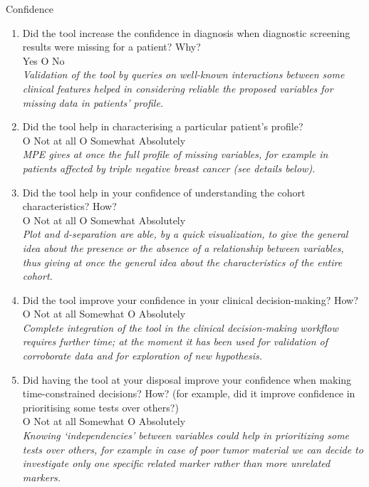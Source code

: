 \begin{mdframed}
	{\Large Confidence}
	\begin{enumerate} 
		\item Did the tool increase the confidence in diagnosis when diagnostic screening results were missing for a patient?  Why? \\
		 Yes O No \\
		\textit{Validation of the tool by queries on well-known interactions between some clinical features helped in considering reliable the proposed variables for missing data in patients' profile.}
		\item Did the tool help in characterising a particular patient's profile? \\
		O Not at all O Somewhat  Absolutely\\
		\textit{MPE gives at once the full profile of missing variables, for example in patients affected by triple negative breast cancer (see details below).}
		\item Did the tool help in your confidence of understanding the cohort characteristics?  How? \\
		O Not at all O Somewhat  Absolutely\\
		\textit{Plot and d-separation are able, by a quick visualization, to give the general idea about the presence or the absence of a relationship between variables, thus giving at once the general idea about the characteristics of the entire cohort.}
		\item Did the tool improve your confidence in your clinical decision-making?  How? \\ 
		O Not at all  Somewhat O Absolutely\\
		\textit{Complete integration of the tool in the clinical decision-making workflow requires further time; at the moment it has been used for validation of corroborate data and for exploration of new hypothesis.}
		\item Did having the tool at your disposal improve your confidence when making time-constrained decisions?  How? (for example, did it improve confidence in prioritising some tests over others?) \\
		O Not at all  Somewhat O Absolutely\\
		\textit{Knowing `independencies' between variables could help in prioritizing some tests over others, for example in case of poor tumor material we can decide to investigate only one specific related marker rather than more unrelated markers. }
	\end{enumerate}
	\label{ques:confidence}
\end{mdframed}

